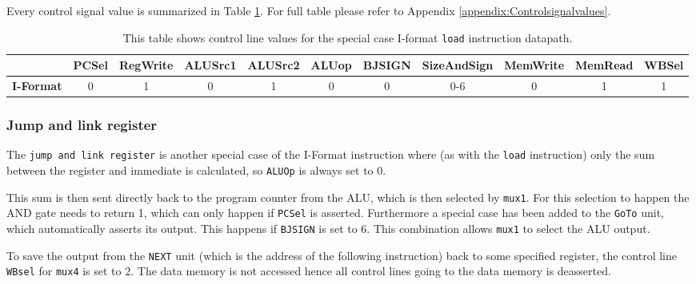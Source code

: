             Every control signal value is summarized in Table \ref{table:LOADFORMAT}. For full table please refer to Appendix \ref{appendix:Controlsignalvalues}.
            
            
            \begin{table}[h!]
                \small
                \hspace{-2.4cm}
                \begin{tabular}{|c||c|c|c|c|c|c|c|c|c|c|}
                	\hline
                	                  & \textbf{PCSel} & \textbf{RegWrite} & \textbf{ALUSrc1} & \textbf{ALUSrc2} & \textbf{ALUop} & \textbf{BJSIGN} & \textbf{SizeAndSign} & \textbf{MemWrite} & \textbf{MemRead} & \textbf{WBSel} \\ \hline\hline
                	\textbf{I-Format} &       0        &         1         &        0         &        1         &      0      &        0        &          0-6           &         0         &        1         &       1        \\ \hline
                \end{tabular}
                \caption{This table shows control line values for the special case I-format \texttt{load} instruction datapath. }
                \label{table:LOADFORMAT}
            \end{table}
        
        \subsubsection{Jump and link register}
            The \texttt{jump and link register} is another special case of the I-Format instruction where (as with the \texttt{load} instruction) only the sum between the register and immediate is calculated, so \texttt{ALUOp} is always set to 0.
            
            This sum is then sent directly back to the program counter from the ALU, which is then selected by \texttt{mux1}. For this selection to happen the AND gate needs to return 1, which can only happen if \texttt{PCSel} is asserted. Furthermore a special case has been added to the \texttt{GoTo} unit, which automatically asserts its output. This happens if \texttt{BJSIGN} is set to 6. This combination allows \texttt{mux1} to select the ALU output.
            
            To save the output from the \texttt{NEXT} unit (which is the address of the following instruction) back to some specified register, the control line \texttt{WBsel} for \texttt{mux4} is set to 2. The data memory is not accessed hence all control lines going to the data memory is deasserted.
            
